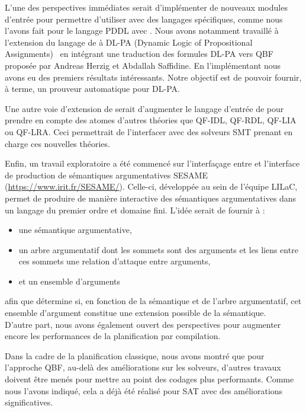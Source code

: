 L'une des perspectives immédiates serait d'implémenter de nouveaux modules d'entrée pour permettre d'utiliser \touist avec des langages spécifiques, comme nous l'avons fait pour le langage PDDL avec \touistplan.
Nous avons notamment travaillé à l'extension du langage de \touist à DL-PA (Dynamic Logic of Propositional Assignments)~\cite{DBLP:conf/lics/BalbianiHT13} en intégrant une traduction des formules DL-PA vers QBF proposée par Andreas Herzig et Abdallah Saffidine. En l'implémentant nous avons eu des premiers résultats intéressants. Notre objectif est de pouvoir fournir, à terme, un prouveur automatique pour DL-PA.

Une autre voie d'extension de \touist serait d'augmenter le langage d'entrée de \touist pour prendre en compte des atomes d'autres théories que QF-IDL, QF-RDL, QF-LIA ou QF-LRA. Ceci permettrait de l'interfacer avec des solveurs SMT prenant en charge ces nouvelles théories.

Enfin, un travail exploratoire a été commencé sur l'interfaçage entre \touist et l'interface de production de sémantiques argumentatives SESAME (\url{https://www.irit.fr/SESAME/}). Celle-ci, développée au sein de l'équipe LILaC, permet de produire de manière interactive des sémantiques argumentatives dans un langage du premier ordre et domaine fini. L'idée serait de fournir à \touist :
\begin{itemize}
    \item une sémantique argumentative,
    \item un arbre argumentatif dont les sommets sont des arguments et les liens entre ces sommets une relation d'attaque entre arguments,
    \item et un ensemble d'arguments
\end{itemize}
afin que \touist détermine si, en fonction de la sémantique et de l'arbre argumentatif, cet ensemble d'argument constitue une extension possible de la sémantique.\\


D'autre part, nous avons également ouvert des perspectives pour augmenter encore les performances de la planification par compilation.

Dans la cadre de la planification classique, nous avons montré que pour l'approche QBF, au-delà des améliorations sur les solveurs, d'autres travaux doivent être menés pour mettre au point des codages plus performants. Comme nous l'avons indiqué, cela a déjà été réalisé pour SAT avec des améliorations significatives.

